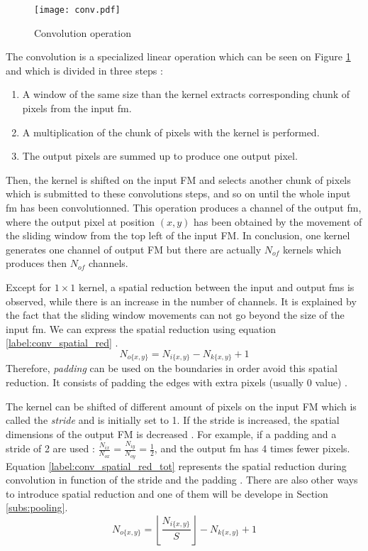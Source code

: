 \begin{figure}
    \centering
    \texttt{[image: conv.pdf]}
    \caption{Convolution operation}
    \label{fig:convolution}
\end{figure}
%
The convolution is a specialized linear operation which can be seen on Figure \ref{fig:convolution} and which is divided in three steps \cite{matteucci_artificial_2019, zhu_efficient_2020}:
%
\begin{enumerate}
    \item A window of the same size than the kernel extracts corresponding chunk of pixels from the input \acrshort{fm}.
    \item A multiplication of the chunk of pixels with the kernel is performed.
    \item The output pixels are summed up to produce one output pixel.
\end{enumerate}
%
Then, the kernel is shifted on the input FM and selects another chunk of pixels which is submitted to these convolutions steps, and so on until the whole input \acrshort{fm} has been convolutionned. This operation produces a channel of the output \acrshort{fm}, where the output pixel at position $(x, y)$ has been obtained by the movement of the sliding window from the top left of the input FM. In conclusion, one kernel generates one channel of output FM but there are actually $N_{of}$ kernels which produces then $N_{of}$ channels.

Except for $1 \times 1$ kernel, a spatial reduction between the input and output \acrshort{fm}s is observed, while there is an increase in the number of channels. It is explained by the fact that the sliding window movements can not go beyond the size of the input \acrshort{fm}. We can express the spatial reduction using equation \eqref{label:conv_spatial_red} \cite{ma_optimizing_2018}.
%
\begin{equation}
    N_{o\{x,y\}} = N_{i\{x,y\}} - N_{k\{x,y\}} + 1
    \label{label:conv_spatial_red}
\end{equation}
%
Therefore, \textit{padding} can be used on the boundaries in order avoid this spatial reduction. It consists of padding the edges with extra pixels (usually 0 value) \cite{liu_fpga-based_2019}.

The kernel can be shifted of different amount of pixels on the input FM which is called the \textit{stride} and is initially set to 1. If the stride is increased, the spatial dimensions of the output FM is decreased \cite{liu_fpga-based_2019}. For example, if a padding and a stride of 2 are used : $\frac{N_{ix}}{N_{ox}} = \frac{N_{iy}}{N_{oy}} = \frac{1}{2}$, and the output \acrshort{fm} has 4 times fewer pixels. Equation \eqref{label:conv_spatial_red_tot} represents the spatial reduction during convolution in function of the stride and the padding \cite{ma_optimizing_2018}. There are also other ways to introduce spatial reduction and one of them will be develope in Section \ref{subs:pooling}.
%
\begin{equation}
    N_{o\{x,y\}} = \left\lfloor \frac{ N_{i\{x,y\}}}{S} \right\rfloor - N_{k\{x,y\}} + 1
    \label{label:conv_spatial_red_tot}
\end{equation}

